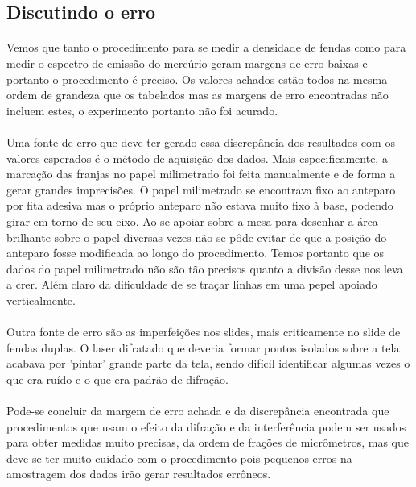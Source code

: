 \documentclass[a4paper,11pt]{article}
\begin{document}
\subsection{Discutindo o erro}
\paragraph{}Vemos que tanto o procedimento para se medir
a densidade de fendas como para medir o espectro de emissão
do mercúrio geram margens de erro baixas e portanto o
procedimento é preciso. Os valores achados estão todos na 
mesma ordem de grandeza que os tabelados mas as margens de
erro encontradas não incluem estes, o experimento portanto
não foi acurado. 

\paragraph{}Uma fonte de erro que deve ter gerado essa
discrepância dos resultados com os valores esperados é o
método de aquisição dos dados. Mais especificamente, a
marcação das franjas no papel milimetrado foi feita
manualmente e de forma a gerar grandes imprecisões. O papel
milimetrado se encontrava fixo ao anteparo por fita adesiva
mas o próprio anteparo não estava muito fixo à base, podendo
girar em torno de seu eixo. Ao se apoiar sobre a mesa para
desenhar a área brilhante sobre o papel diversas vezes
não se pôde evitar
de que a posição do anteparo fosse modificada ao longo do
procedimento. Temos portanto que os dados do papel
milimetrado não são tão precisos quanto a divisão desse nos 
leva a crer. Além claro da dificuldade de se traçar linhas
em uma pepel apoiado verticalmente.

\paragraph{}Outra fonte de erro são as imperfeições nos
slides, mais criticamente no slide de fendas duplas. O laser
difratado
que deveria formar pontos isolados sobre a tela acabava por
'pintar' grande parte da tela, sendo difícil identificar
algumas vezes o que era ruído e o que era padrão de
difração.

\paragraph{}Pode-se concluir da margem de erro achada e da
discrepância encontrada que procedimentos que usam o efeito
da difração e da interferência podem ser usados para obter
medidas muito precisas, da ordem de frações de micrômetros,
mas que deve-se ter muito cuidado com o procedimento pois 
pequenos erros na amostragem dos dados irão gerar resultados
errôneos.
\end{document}
